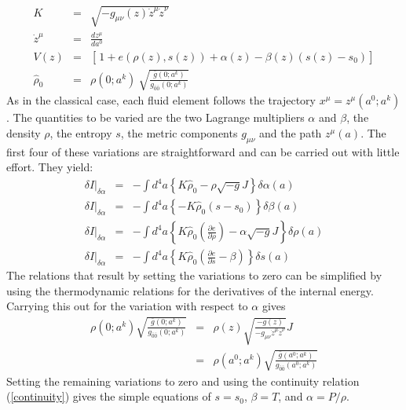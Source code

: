 \begin{eqnarray}
K & = & \sqrt{ -g_{\mu \nu}(z) {\dot z}^{\mu} {\dot z}^{\nu} } \\
{\dot z}^{\mu} & = & \frac{d z^{\mu}}{d a^{0}}  \\
V(z) & = & \left[\frac{}{} \! 1 + e(\rho(z),s(z)) + \alpha(z) - \beta(z) (s(z) - s_{0}) \right]  \\
{\hat \rho}_{0} & = & \rho(0;a^k) \ \sqrt{ \frac{\bar g(0;a^k)}{g_{\bar 0 \bar 0}(0;a^k)}}
\end{eqnarray}
As in the classical case, each fluid element follows the trajectory $x^{\mu} = z^{\mu}(a^{0};a^{k})$.  The quantities to be varied are the two Lagrange multipliers $\alpha$ and $\beta$, the density $\rho$, the entropy $s$, the metric components $g_{\mu \nu}$ and the path $z^{\mu}(a)$.  The first four of these variations are straightforward and can be carried out with little effort.  They yield:
\begin{eqnarray}
\delta I \vert_{\delta \alpha} & = & - \int \! d^4a 
	\left\{ 
		K {\hat \rho}_{0} - \rho \sqrt{-g} J 
	\right\} \delta \alpha(a) \\
\delta I \vert_{\delta \alpha} & = & - \int \! d^4a 
	\left\{ 
		-K {\hat \rho}_{0} \left( s - s_{0} \right)  
	\right\} \delta \beta(a) \\
\delta I \vert_{\delta \alpha} & = & - \int \! d^4a 
	\left\{ 
		K {\hat \rho}_{0} \left( \frac{\partial e}{\partial \rho}  \right)
		- \alpha \sqrt{-g} J
	\right\} \delta \rho(a) \\
\delta I \vert_{\delta \alpha} & = & - \int \! d^4a 
	\left\{ 
		K {\hat \rho}_{0} \left( \frac{\partial e}{\partial s} - 
		\beta \right)
	\right\} \delta s(a)
\end{eqnarray}
The relations that result by setting the variations to zero can be simplified by using the thermodynamic relations for the derivatives of the internal energy.  Carrying this out for the variation with respect to $\alpha$ gives 
\begin{eqnarray}\label{continuity}
\rho(0;a^{k}) \sqrt{ \frac{ {\bar g}(0;a^{k})}{g_{\bar 0 \bar 0}(0;a^{k})}} 
	& = & 
		\rho(z) \sqrt{ \frac{-g(z)}{-g_{\mu \nu} {\dot z}^{\mu} 
		{\dot z}^{\nu} } } J \nonumber \\
	& = &
		\rho(a^{0};a^{k}) \sqrt{ \frac{ \bar g(a^{0};a^{k})}{g_{\bar 0
		\bar 0}(a^{0};a^{k})}}
\end{eqnarray}
Setting the remaining variations to zero and using the continuity relation (\ref{continuity}) gives the simple equations of $s = s_{0}$, $\beta = T$, and $\alpha = P / \rho$.  


